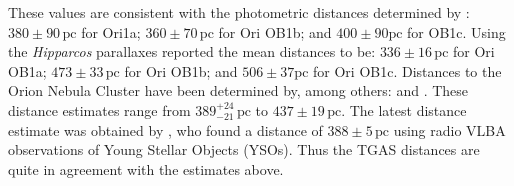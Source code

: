 \documentclass[onecolumn]{aa} %
\begin{document}
These values are consistent with the photometric distances determined by \cite{Brown1994}: $380 \pm 90 \, \mathrm{pc}$ for Ori1a; $360 \pm 70\, \mathrm{pc}$ for Ori OB1b; and $400 \pm 90 \mathrm{pc}$ for OB1c.
Using the \textit{Hipparcos} parallaxes \cite{deZeeuw1999} reported the mean distances to be:  $336 \pm 16 \, \mathrm{pc}$ for Ori OB1a; $473 \pm 33\, \mathrm{pc}$ for Ori OB1b; and $506 \pm 37 \mathrm{pc}$ for Ori OB1c. 
Distances to the Orion Nebula Cluster have been determined by, among others: \citet{Stassun2004, Hirota2007, Jeffries2007, Menten2007, Sandstrom2007, Kim2008} and \citet{Kraus2009}. These distance estimates range from $389^{+24}_{-21} \, \mathrm{pc}$ to  $437 \pm 19\, \mathrm{pc}$. The latest distance estimate was obtained by \cite{Kounkel2017a}, who found a distance of $388 \pm 5 \, \mathrm{pc}$  using radio VLBA observations of Young Stellar Objects (YSOs). Thus the TGAS distances are quite in agreement with the estimates above.
\end{document}
